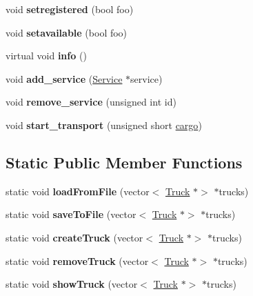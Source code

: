 \begin{DoxyCompactItemize}
void {\bfseries setregistered} (bool foo)
\item 
\mbox{\label{class_truck_a59ca935a364da118131ed85647aa4f0d}} 
void {\bfseries setavailable} (bool foo)
\item 
\mbox{\label{class_truck_a38f09eab2822524e355ecf6d0a13f7de}} 
virtual void {\bfseries info} ()
\item 
\mbox{\label{class_truck_a03c8acd51c35f24db74cd8b2ee20cacb}} 
void {\bfseries add\+\_\+service} (\hyperlink{class_service}{Service} $\ast$service)
\item 
\mbox{\label{class_truck_a0abc7397fd6dba0eeeb2b5ae3e225fd1}} 
void {\bfseries remove\+\_\+service} (unsigned int id)
\item 
\mbox{\label{class_truck_aca68ecb83bcdc73de6bd381dccb70e4d}} 
void {\bfseries start\+\_\+transport} (unsigned short \hyperlink{class_truck_a968fc6b1a6171a03e4254d6615da4ecd}{cargo})
\end{DoxyCompactItemize}
\subsection*{Static Public Member Functions}
\begin{DoxyCompactItemize}
\item 
\mbox{\label{class_truck_ae2d129e4cdd6760feee9a81421d40e17}} 
static void {\bfseries load\+From\+File} (vector$<$ \hyperlink{class_truck}{Truck} $\ast$$>$ $\ast$trucks)
\item 
\mbox{\label{class_truck_ad03e7d588f7f6dc24e1423e2e481ad3a}} 
static void {\bfseries save\+To\+File} (vector$<$ \hyperlink{class_truck}{Truck} $\ast$$>$ $\ast$trucks)
\item 
\mbox{\label{class_truck_a4b2a202b4fe0bf70249493a9aa30f5dd}} 
static void {\bfseries create\+Truck} (vector$<$ \hyperlink{class_truck}{Truck} $\ast$$>$ $\ast$trucks)
\item 
\mbox{\label{class_truck_acb3e375dfa4ba812de7e65f0b3e37ded}} 
static void {\bfseries remove\+Truck} (vector$<$ \hyperlink{class_truck}{Truck} $\ast$$>$ $\ast$trucks)
\item 
\mbox{\label{class_truck_a093fa621d8576a61352648799920c8a2}} 
static void {\bfseries show\+Truck} (vector$<$ \hyperlink{class_truck}{Truck} $\ast$$>$ $\ast$trucks)
\end{DoxyCompactItemize}
